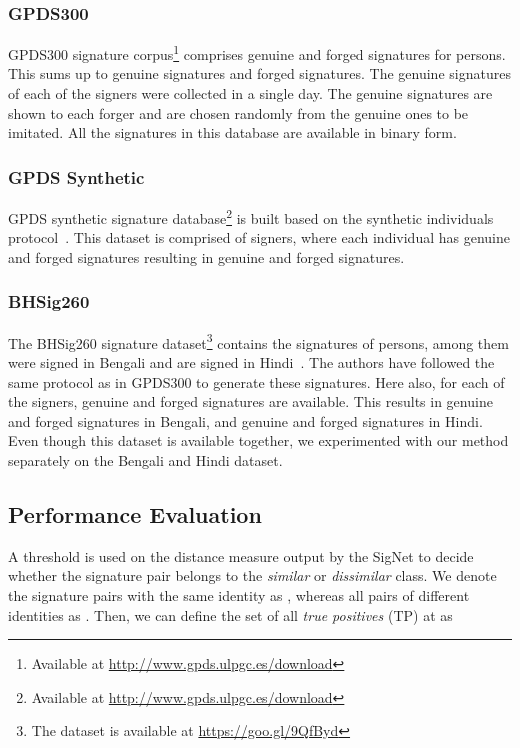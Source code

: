 \documentclass[times,twocolumn,final]{elsarticle}
\begin{document}
\subsubsection{GPDS300}
\label{sec:gpds300}
GPDS300 signature corpus\footnote{Available at \url{http://www.gpds.ulpgc.es/download}} comprises  genuine and  forged signatures for  persons. This sums up to  genuine signatures and  forged signatures. The  genuine signatures of each of the signers were collected in a single day. The genuine signatures are shown to each forger and are chosen randomly from the  genuine ones to be imitated. All the signatures in this database are available in binary form.

\subsubsection{GPDS Synthetic}
\label{sec:gpds_synth}
GPDS synthetic signature database\footnote{Available at \url{http://www.gpds.ulpgc.es/download}} is built based on the synthetic individuals protocol~\cite{Ferrer2013}. This dataset is comprised of  signers, where each individual has  genuine and  forged signatures resulting in  genuine and  forged signatures.

\subsubsection{BHSig260}
\label{sec:bhsig260}
The BHSig260 signature dataset\footnote{The dataset is available at \url{https://goo.gl/9QfByd}} contains the signatures of  persons, among them  were signed in Bengali and  are signed in Hindi~\cite{Pal2016}. The authors have followed the same protocol as in GPDS300 to generate these signatures. Here also, for each of the signers,  genuine and  forged signatures are available. This results in  genuine and  forged signatures in Bengali, and  genuine and  forged signatures in Hindi. Even though this dataset is available together, we experimented with our method separately on the Bengali and Hindi dataset.

\subsection{Performance Evaluation}
A threshold  is used on the distance measure  output by the SigNet to decide whether the signature pair  belongs to the \emph{similar} or \emph{dissimilar} class. We denote the signature pairs  with the same identity as , whereas all pairs of different identities as . Then, we can define the set of all \emph{true positives} (TP) at  as
\end{document}

